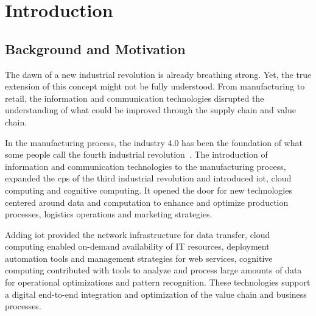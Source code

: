 
\chapter{Introduction}

\section{Background and Motivation}

The dawn of a new industrial revolution is already breathing strong. Yet, the true extension of this concept might not be fully understood.
From manufacturing to retail, the information and communication technologies disrupted the understanding of what could be improved through the \gls{supply chain} and \gls{value chain}. 

In the manufacturing process, the \gls{industry 4.0} has been the foundation of what some people call the fourth industrial revolution~\cite{marrWhatIndustryHere}.
The introduction of information and communication technologies to the manufacturing process, expanded the \gls{cps} of the third industrial revolution and introduced \gls{iot}, \gls{cloud computing} and \gls{cognitive computing}. 
It opened the door for new technologies centered around data and computation to enhance and optimize production processes, logistics operations and marketing strategies.

Adding \gls{iot} provided the network infrastructure for data transfer, \gls{cloud computing} enabled on-demand availability of \gls{IT} resources, deployment automation tools and management strategies for \gls{web services}, \gls{cognitive computing} contributed with tools to analyze and process large amounts of data for operational optimizations and pattern recognition.
These technologies support a digital end-to-end integration and optimization of the \gls{value chain} and \gls{business processes}. 

